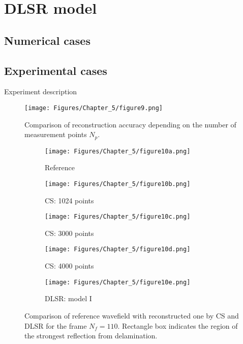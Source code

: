 \section{DLSR model}
\label{sec54}

\subsection{Numerical cases}

\subsection{Experimental cases}

Experiment description

\begin{figure} [h!]
	\centering
	\texttt{[image: Figures/Chapter\_5/figure9.png]}
	\caption{Comparison of reconstruction accuracy depending on the number of measurement points $N_p$.}
	\label{fig:points_metrics}
\end{figure}

\begin{figure} [h!]
	\centering
	\begin{subfigure}[b]{0.32\textwidth}
		\centering
		\texttt{[image: Figures/Chapter\_5/figure10a.png]}
		\caption{Reference}
		\label{fig:frame110_ref}
	\end{subfigure}
	\hfill
	\begin{subfigure}[b]{0.32\textwidth}
		\centering
		\texttt{[image: Figures/Chapter\_5/figure10b.png]}
		\caption{CS: 1024 points}
		\label{fig:frame110_CS1024}
	\end{subfigure}
	\hfill
	\begin{subfigure}[b]{0.32\textwidth}
		\centering
		\texttt{[image: Figures/Chapter\_5/figure10c.png]}
		\caption{CS: 3000 points}
		\label{fig:frame110_CS3000}
	\end{subfigure}	
	\hfill
	\begin{subfigure}[b]{0.32\textwidth}
		\centering
		\texttt{[image: Figures/Chapter\_5/figure10d.png]}
		\caption{CS: 4000 points}
		\label{fig:frame110_CS4000}
	\end{subfigure}
	\begin{subfigure}[b]{0.32\textwidth}
		\centering
		\texttt{[image: Figures/Chapter\_5/figure10e.png]}
		\caption{DLSR: model I}
		\label{fig:frame110_Abdalraheem}
	\end{subfigure}
	\caption{Comparison of reference wavefield with reconstructed one by CS and DLSR for the frame $N_f = 110$. Rectangle box indicates the region of the strongest reflection from delamination.}
	\label{fig:frame110_comparison}
\end{figure}

